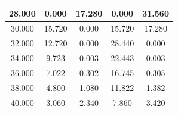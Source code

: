 \documentclass[11pt,letterpaper]{article}
\begin{document}
\begin{table}[H]
\begin{tabular}{|c|c|c|c|c|}
    \hline
    \rowcolor{GeoBlue!5}
    28.000 & 0.000 & 17.280 & 0.000 & 31.560 \\
    \hline
    \rowcolor{white}
    30.000 & 15.720 & 0.000 & 15.720 & 17.280 \\
    \hline
    \rowcolor{GeoBlue!5}
    32.000 & 12.720 & 0.000 & 28.440 & 0.000 \\
    \hline
    \rowcolor{white}
    34.000 & 9.723 & 0.003 & 22.443 & 0.003 \\
    \hline
    \rowcolor{GeoBlue!5}
    36.000 & 7.022 & 0.302 & 16.745 & 0.305 \\
    \hline
    \rowcolor{white}
    38.000 & 4.800 & 1.080 & 11.822 & 1.382 \\
    \hline
    \rowcolor{GeoBlue!5}
    40.000 & 3.060 & 2.340 & 7.860 & 3.420 \\
    \hline
  \end{tabular}
\end{table}
\vspace{0.8cm}
\end{document}
